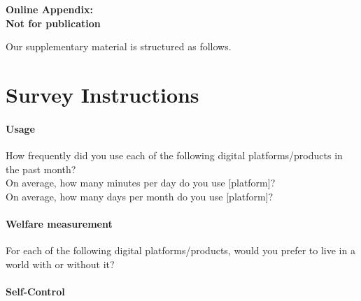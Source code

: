 \documentclass[11pt]{article}
\begin{document}
\clearpage

\appendix


\begin{center}
\Huge \textbf{Online Appendix:\\Not for publication}
\end{center}
Our supplementary material is structured as follows. %

\clearpage

\renewcommand{\thetable}{A\arabic{table}}
\renewcommand{\thefigure}{A\arabic{figure}}
\renewcommand{\tablename}{Appendix Table} 
\renewcommand{\figurename}{Appendix Figure}

\setcounter{table}{0} 
\setcounter{figure}{0}

\section{Survey Instructions}

\paragraph{Usage}

How frequently did you use each of the following digital platforms/products in the past month?\\

On average, how many minutes per day do you use [platform]?\\

On average, how many days per month do you use [platform]?


\paragraph{Welfare measurement}

For each of the following digital platforms/products, would you prefer to live in a world with or without it?

\paragraph{Self-Control}
\end{document}
